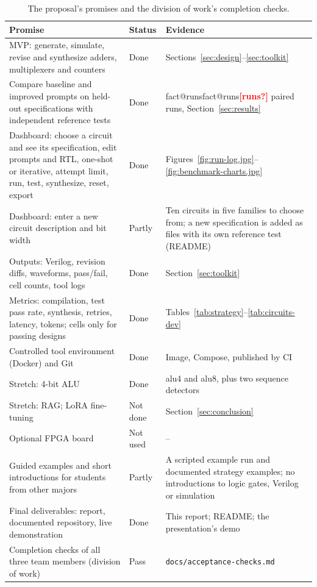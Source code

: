 \documentclass[11pt,a4paper]{article}
\makeatletter
\newcommand{\fact}[1]{\ifcsname fact@#1\endcsname\csname fact@#1\endcsname\else\textcolor{red}{\textbf{[#1?]}}\fi}
\makeatother
\begin{document}
\begin{table}[!htb]
\centering\small
\renewcommand{\arraystretch}{1.25}
\begin{tabularx}{\linewidth}{>{\raggedright\arraybackslash}p{6.2cm} >{\raggedright\arraybackslash}p{1.9cm} X}
\toprule
Promise & Status & Evidence \\
\midrule
MVP: generate, simulate, revise and synthesize adders, multiplexers and counters & Done & Sections~\ref{sec:design}--\ref{sec:toolkit} \\
Compare baseline and improved prompts on held-out specifications with independent reference tests & Done & \fact{runs} paired runs, Section~\ref{sec:results} \\
Dashboard: choose a circuit and see its specification, edit prompts and RTL, one-shot or iterative, attempt limit, run, test, synthesize, reset, export & Done & Figures~\ref{fig:run-log.jpg}--\ref{fig:benchmark-charts.jpg} \\
Dashboard: enter a new circuit description and bit width & Partly & Ten circuits in five families to choose from; a new specification is added as files with its own reference test (README) \\
Outputs: Verilog, revision diffs, waveforms, pass/fail, cell counts, tool logs & Done & Section~\ref{sec:toolkit} \\
Metrics: compilation, test pass rate, synthesis, retries, latency, tokens; cells only for passing designs & Done & Tables~\ref{tab:strategy}--\ref{tab:circuits-dev} \\
Controlled tool environment (Docker) and Git & Done & Image, Compose, published by CI \\
Stretch: 4-bit ALU & Done & alu4 and alu8, plus two sequence detectors \\
Stretch: RAG; LoRA fine-tuning & Not done & Section~\ref{sec:conclusion} \\
Optional FPGA board & Not used & -- \\
Guided examples and short introductions for students from other majors & Partly & A scripted example run and documented strategy examples; no introductions to logic gates, Verilog or simulation \\
Final deliverables: report, documented repository, live demonstration & Done & This report; README; the presentation's demo \\
Completion checks of all three team members (division of work) & Pass & \texttt{docs/acceptance-checks.md} \\
\bottomrule
\end{tabularx}
\caption{The proposal's promises and the division of work's completion checks.}
\label{tab:deliverables}
\end{table}
\end{document}
